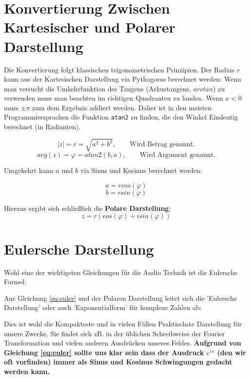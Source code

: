 \section{Konvertierung Zwischen Kartesischer und Polarer Darstellung}
Die Konvertierung folgt klassischen trigonometrischen Prinzipien.
Der Radius $r$ kann aus der Kartesischen Darstellung via Pythagoras berechnet werden:
Wenn man versucht die Umkehrfunktion des Tangens (Arkustangens, $arctan$) zu verwenden muss man beachten im richtigen Quadranten zu landen. Wenn $x<0$ muss $\pm \pi$ zum dem Ergebnis addiert werden. Daher ist in den meisten Programmiersprachen die Funktion \texttt{atan2} zu finden, die den Winkel Eindeutig berechnet (in Radianten). 

$$|z| = r = \sqrt{a^2 + b^2}, \qquad \text{Wird Betrag genannt.}$$
$$ arg(z) = \varphi = atan2(b,a), \qquad \text{Wird Argument genannt.} $$



Umgekehrt kann $a$ und $b$ via Sinus und Kosinus berechnet werden:

$$a = r cos(\varphi)$$
$$b = r sin(\varphi)$$

Hieraus ergibt sich schließlich die \textbf{Polare Darstellung}:
$$ z = r (cos(\varphi) + i sin(\varphi))$$




\section{Eulersche Darstellung}


Wohl eine der wichtigsten Gleichungen für die Audio Technik ist die Eulersche Formel:


Aus Gleichung \ref{eq:euler} und der Polaren Darstellung leitet sich die 'Eulersche Darstellung' oder auch 'Exponentialform' für komplexe Zahlen ab:


Dies ist wohl die Kompakteste und in vielen Fällen Praktischste Darstellung für unsere Zwecke. Sie findet sich zB. in der üblichen Schreibweise der Fourier Transformation und vielen anderen Ausdrücken unseres Feldes. \textbf{Aufgrund von Gleichung \ref{eq:euler} sollte uns klar sein dass der Ausdruck $e^{ix}$ (den wir oft vorfinden) immer als Sinus und Kosinus Schwingungen gedacht werden kann.}


